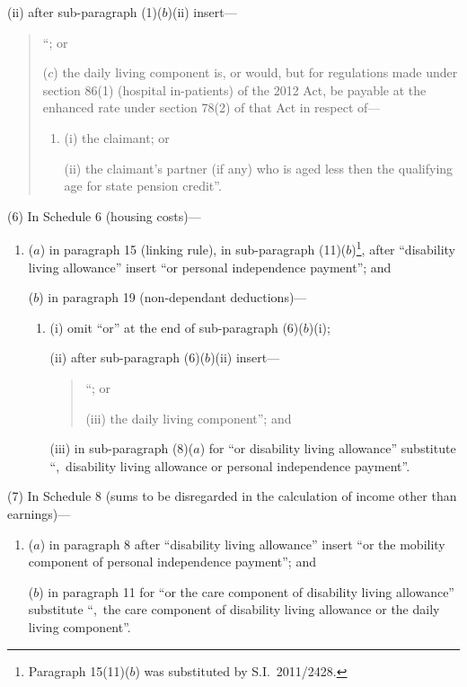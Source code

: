 \documentclass[12pt,a4paper]{article}
\begin{document}
\begin{enumerate}
\begin{enumerate}
(ii) after sub-paragraph (1)($b$)(ii)  insert—
\begin{quotation}
“; or

($c$) the daily living component is, or would, but for regulations made under section 86(1) (hospital in-patients) of the 2012 Act, be payable at the enhanced rate under section 78(2) of that Act in respect of—
\begin{enumerate}\item[]
(i) the claimant; or

(ii) the claimant’s partner (if any) who is aged less then the qualifying age for state pension credit”.
\end{enumerate}
\end{quotation}
\end{enumerate}
\end{enumerate}

(6) In Schedule 6 (housing costs)—
\begin{enumerate}\item[]
($a$) in paragraph 15 (linking rule), in sub-paragraph (11)($b$)\footnote{Paragraph 15(11)($b$)  was substituted by S.I.~2011/2428.}, after “disability living allowance” insert “or personal independence payment”; and

($b$) in paragraph 19 (non-dependant deductions)—
\begin{enumerate}\item[]
(i) omit “or” at the end of sub-paragraph (6)($b$)(i);

(ii) after sub-paragraph (6)($b$)(ii)  insert—
\begin{quotation}
“; or

(iii) the daily living component”; and
\end{quotation}

(iii) in sub-paragraph (8)($a$)  for “or disability living allowance” substitute “,~disability living allowance or personal independence payment”.
\end{enumerate}
\end{enumerate}

(7) In Schedule 8 (sums to be disregarded in the calculation of income other than earnings)—
\begin{enumerate}\item[]
($a$) in paragraph 8 after “disability living allowance” insert “or the mobility component of personal independence payment”; and

($b$) in paragraph 11 for “or the care component of disability living allowance” substitute “,~the care component of disability living allowance or the daily living component”.
\end{enumerate}
\end{document}
